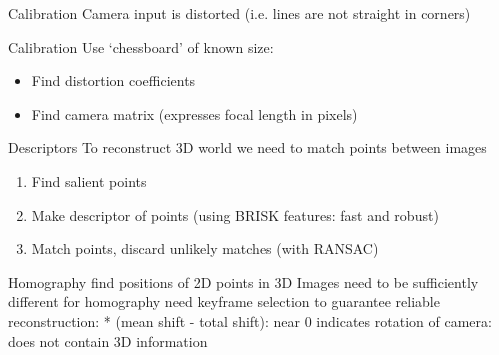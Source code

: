 \documentclass{beamer}
\begin{document}
\begin{frame}{Calibration}
	Camera input is distorted (i.e. lines are not straight in corners)

\end{frame}

\begin{frame}{Calibration}
	Use `chessboard' of known size:
	\begin{itemize}
		\item Find distortion coefficients
		\item Find camera matrix (expresses focal length in pixels)
	\end{itemize}

\end{frame}

\begin{frame}{Descriptors}
	To reconstruct 3D world we need to match points between images
	\begin{enumerate}
		\item Find salient points
		\item Make descriptor of points (using BRISK features: fast and robust)
		\item Match points, discard unlikely matches (with RANSAC)
	\end{enumerate}
\end{frame}

\begin{frame}{Homography}
	find positions of 2D points in 3D
	Images need to be sufficiently different for homography
	need keyframe selection to guarantee reliable reconstruction:
	* (mean shift - total shift):
	  near 0 indicates rotation of camera: does not contain 3D information
\end{frame}





\end{document}
